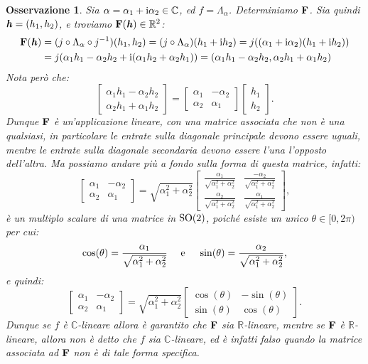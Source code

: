 \documentclass[11pt]{book}
\theoremstyle{Definizione}
\theoremstyle{TeoremaProposizioneLemmaCorollarioCongettura}
\theoremstyle{OsservazioneNotaEsempio}
\newtheorem{myobs}{Osservazione}[section]
\newcommand{\R}{\mathbb{R}}
\newcommand{\C}{\mathbb{C}}
\newcommand{\gro}[1]{\textbf{\textup{#1}}}
\newcommand{\gri}[1]{\textbf{\textit{{#1}}}}
\renewcommand{\i}{\textup{i}}
\begin{document}
\begin{myobs}
Sia $\alpha = \alpha_1+\i \alpha_2\in \C$, ed $f = \Lambda_\alpha$. Determiniamo $\gro{F}$. Sia quindi $\gri{h} = (h_1,h_2)$, e troviamo $\gro{F}(\gri{h})\in \R^2$:
\begin{align*}
\gro{F}(\gri{h}) &= (j\circ \Lambda_\alpha \circ j^{-1})(h_1,h_2) = (j\circ \Lambda_\alpha)(h_1+\i h_2) = j((\alpha_1+\i\alpha_2)(h_1+\i h_2))\\
&= j(\alpha_1h_1-\alpha_2h_2+\i(\alpha_1h_2+\alpha_2h_1)) = (\alpha_1h_1-\alpha_2h_2,\alpha_2h_1+\alpha_1h_2)
\end{align*}
Nota però che:
$$
\begin{bmatrix}
\alpha_1h_1-\alpha_2h_2 \\ \alpha_2h_1+\alpha_1h_2
\end{bmatrix} = \begin{bmatrix}
\alpha_1 & -\alpha_2 \\
\alpha_2 & \alpha_1
\end{bmatrix} \begin{bmatrix}
h_1 \\ h_2
\end{bmatrix}.
$$
Dunque $\gro{F}$ è un'applicazione lineare, con una matrice associata che non è una qualsiasi, in particolare le entrate sulla diagonale principale devono essere uguali, mentre le entrate sulla diagonale secondaria devono essere l'una l'opposto dell'altra. Ma possiamo andare più a fondo sulla forma di questa matrice, infatti:
$$
\begin{bmatrix}
\alpha_1 &-\alpha_2 \\ \alpha_2 & \alpha_1
\end{bmatrix} = \sqrt{\alpha_1^2+\alpha_2^2}\begin{bmatrix}
\displaystyle\frac{\alpha_1}{\sqrt{\alpha_1^2+\alpha_2^2}} & \displaystyle\frac{-\alpha_2}{\sqrt{\alpha_1^2+\alpha_2^2}} \\
\displaystyle\frac{\alpha_2}{\sqrt{\alpha_1^2+\alpha_2^2}} & \displaystyle\frac{\alpha_1}{\sqrt{\alpha_1^2+\alpha_2^2}}
\end{bmatrix},
$$
è un multiplo scalare di una matrice in $\textup{SO}(2)$, poiché esiste un unico $\theta\in [0,2\pi)$ per cui:
$$
\cos(\theta) = \frac{\alpha_1}{\sqrt{\alpha_1^2+\alpha_2^2}} \quad \textup{ e }\quad \sin(\theta) = \frac{\alpha_2}{\sqrt{\alpha_1^2+\alpha_2^2}},
$$
e quindi:
$$
\begin{bmatrix}
\alpha_1 &-\alpha_2 \\ \alpha_2 & \alpha_1
\end{bmatrix} = \sqrt{\alpha_1^2+\alpha_2^2}\begin{bmatrix}
\cos(\theta) & -\sin(\theta) \\
\sin(\theta) & \cos(\theta)
\end{bmatrix}.
$$
Dunque se $f$ è $\C$-lineare allora è garantito che $\gro{F}$ sia $\R$-lineare, mentre se $\gro{F}$ è $\R$-lineare, allora non è detto che $f$ sia $\C$-lineare, ed è infatti falso quando la matrice associata ad $\gro{F}$ non è di tale forma specifica.
\end{myobs}
\end{document}
